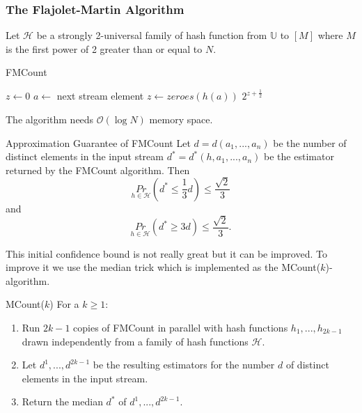 \documentclass[english]{panikzettel}
\begin{document}
\subsubsection{The Flajolet-Martin Algorithm}
Let $\mathcal{H}$ be a strongly 2-universal family of hash function from $\mathbb{U}$ to $[M]$ where $M$ is the first power of 2 greater than or equal to $N$.

\begin{halfboxl}
\vspace{-\baselineskip}
	\begin{algo}{FMCount}
	{
	\renewcommand{\algorithmicrequire}{\textbf{Input:}}
	\renewcommand{\algorithmicensure}{\textbf{Output:}}
	  \begin{algorithmic}[1]
	  \State $z\leftarrow 0$
	  	\State $a\leftarrow$ next stream element
	    \State $z\leftarrow zeroes(h(a))$
	    \EndIf
	  \EndWhile
	  \State \Return $2^{z+\frac{1}{2}}$
	  \end{algorithmic}
	}
	\end{algo}

	The algorithm needs $\mathcal{O}(\log N)$ memory space.
\end{halfboxl}
\begin{halfboxr}
	\vspace{-\baselineskip}
	\begin{theo}{Approximation Guarantee of FMCount}
	Let $d=d(a_1,...,a_n)$ be the number of distinct elements in the input stream $d^*=d^*(h,a_1,...,a_n)$ be the estimator returned by the FMCount algorithm. Then
	\[
	\underset{h\in\mathcal{H}}{Pr} \left(d^*\leq \frac{1}{3}d\right) \leq \frac{\sqrt{2}}{3}
	\]
	and
	\[
	\underset{h\in\mathcal{H}}{Pr}(d^* \geq 3d)\leq \frac{\sqrt{2}}{3}.
	\]
	\end{theo}
\end{halfboxr}

This initial confidence bound is not really great but it can be improved. To improve it we use the median trick which is implemented as the MCount($k$)-algorithm.


\begin{algo}{MCount($k$)}
For a $k\geq 1$:
\begin{enumerate}
\item Run $2k-1$ copies of FMCount in parallel with hash functions $h_1,...,h_{2k-1}$ drawn independently from a family of hash functions $\mathcal{H}$.
\item Let $d^1,...,d^{2k-1}$ be the resulting estimators for the number $d$ of distinct elements in the input stream.
\item Return the median $d^*$ of $d^1,...,d^{2k-1}$.
\end{enumerate}
\end{algo}
\end{document}
